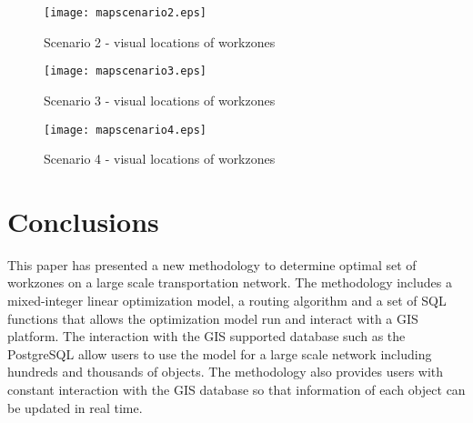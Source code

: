 \documentclass[a4paper,3p,times,authoryear]{elsarticle}
\begin{document}
\begin{figure}[H]
\begin{center}
\texttt{[image: mapscenario2.eps]}
\caption{Scenario 2 - visual locations of workzones}\label{mapscenario2}
\end{center}
\end{figure}


\begin{figure}[H]
\begin{center}
\texttt{[image: mapscenario3.eps]}
\caption{Scenario 3 - visual locations of workzones}\label{mapscenario3}
\end{center}
\end{figure}


\begin{figure}[H]
\begin{center}
\texttt{[image: mapscenario4.eps]}
\caption{Scenario 4 - visual locations of workzones}\label{mapscenario4}
\end{center}
\end{figure}


%
% 
% 
% 
\section{Conclusions} \label{conclusion}
This paper has presented a new methodology to determine optimal set of workzones on a large scale transportation network. The methodology includes a mixed-integer linear optimization model, a routing algorithm and a set of SQL functions that allows the optimization model run and interact with a GIS platform. The interaction with the GIS supported database such as the PostgreSQL allow users to use the model for a large scale network including hundreds and thousands of objects. The methodology also provides users with constant interaction with the GIS database so that information of each object can be updated in real time.
\end{document}
